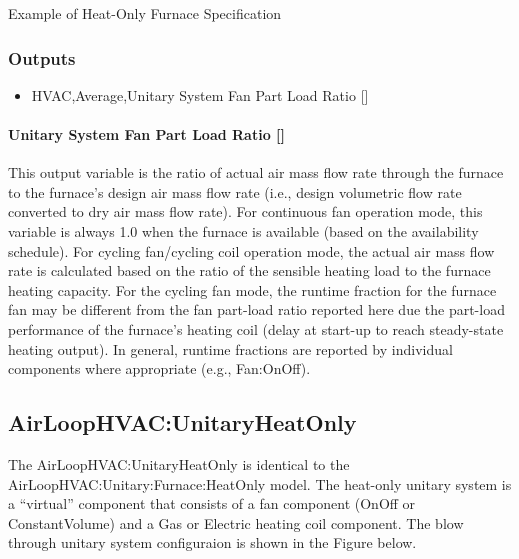 Example of Heat-Only Furnace Specification

\subsubsection{Outputs}\label{outputs-4-018}

\begin{itemize}
\tightlist
\item
  HVAC,Average,Unitary System Fan Part Load Ratio {[]}
\end{itemize}

\paragraph{\texorpdfstring{Unitary System Fan Part Load Ratio {[]}}{Unitary System Fan Part Load Ratio }}\label{unitary-system-fan-part-load-ratio-5}

This output variable is the ratio of actual air mass flow rate through the furnace to the furnace's design air mass flow rate (i.e., design volumetric flow rate converted to dry air mass flow rate). For continuous fan operation mode, this variable is always 1.0 when the furnace is available (based on the availability schedule). For cycling fan/cycling coil operation mode, the actual air mass flow rate is calculated based on the ratio of the sensible heating load to the furnace heating capacity. For the cycling fan mode, the runtime fraction for the furnace fan may be different from the fan part-load ratio reported here due the part-load performance of the furnace's heating coil (delay at start-up to reach steady-state heating output). In general, runtime fractions are reported by individual components where appropriate (e.g., Fan:OnOff).

\subsection{AirLoopHVAC:UnitaryHeatOnly}\label{airloophvacunitaryheatonly}

The AirLoopHVAC:UnitaryHeatOnly is identical to the AirLoopHVAC:Unitary:Furnace:HeatOnly model. The heat-only unitary system is a ``virtual'' component that consists of a fan component (OnOff or ConstantVolume) and a Gas or Electric heating coil component. The blow through unitary system configuraion is shown in the Figure below.

